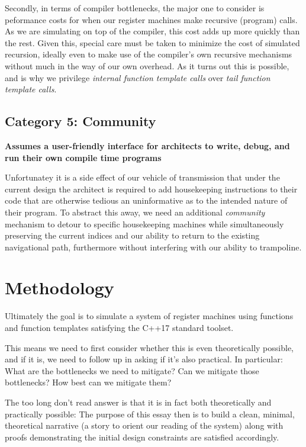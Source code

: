 \documentclass[twoside]{article}
\newcommand{\strong}[1]{{\bfseries #1}}
\begin{document}
Secondly, in terms of compiler bottlenecks, the major one to consider is peformance costs for when our register machines
make recursive (program) calls. As we are simulating on top of the compiler, this cost adds up more quickly than the
rest. Given this, special care must be taken to minimize the cost of simulated recursion, ideally even to make use
of the compiler's own recursive mechanisms without much in the way of our own overhead. As it turns out this is possible,
and is why we privilege \emph{internal function template calls} over \emph{tail function template calls}.

\subsection*{Category 5: Community}

\strong{Assumes a user-friendly interface for architects to write, debug, and run their own compile time programs}

Unfortunatey it is a side effect of our vehicle of transmission that under the current design the architect
is required to add housekeeping instructions to their code that are otherwise tedious an uninformative as
to the intended nature of their program. To abstract this away, we need an additional \emph{community}
mechanism to detour to specific housekeeping machines while simultaneously preserving the current indices
and our ability to return to the existing navigational path, furthermore without interfering with our
ability to trampoline.

\section*{Methodology}

Ultimately the goal is to simulate a system of register machines using functions and function templates
satisfying the C++17 standard toolset.

This means we need to first consider whether this is even theoretically possible, and if it is, we need to follow
up in asking if it's also practical. In particular: What are the bottlenecks we need to mitigate? Can we mitigate
those bottlenecks? How best can we mitigate them?

The too long don't read answer is that it is in fact both theoretically and practically possible: The purpose of this
essay then is to build a clean, minimal, theoretical narrative (a story to orient our reading of the system) along
with proofs demonstrating the initial design constraints are satisfied accordingly.
\end{document}

